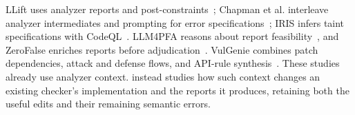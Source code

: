 LLift uses analyzer reports and post-constraints~\cite{li2024llift}; Chapman et al. interleave analyzer intermediates and prompting for error specifications~\cite{chapman2024interleaving}; IRIS infers taint specifications with CodeQL~\cite{li2025iris}.
LLM4PFA reasons about report feasibility~\cite{du2025llm4pfa}, and ZeroFalse enriches reports before adjudication~\cite{iranmanesh2025zerofalse}.
VulGenie combines patch dependencies, attack and defense flows, and API-rule synthesis~\cite{chen2026vulgenie}.
These studies already use analyzer context.
\toolname instead studies how such context changes an existing checker's implementation and the reports it produces, retaining both the useful edits and their remaining semantic errors.
